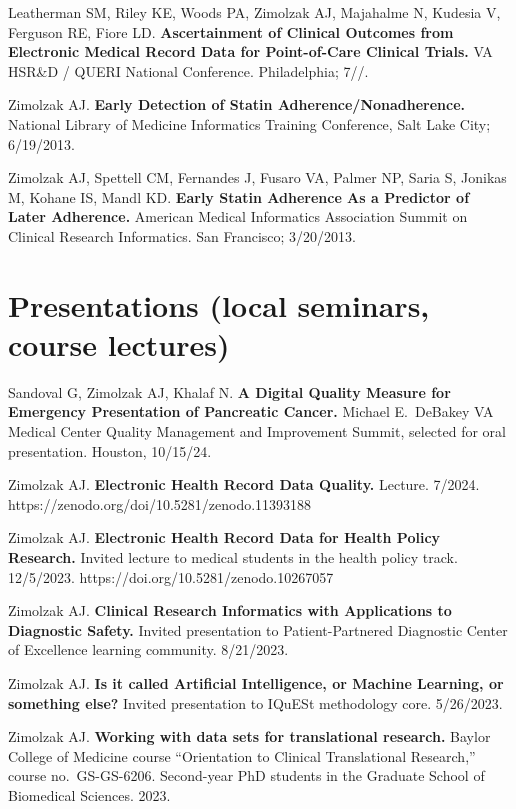 \documentclass[10pt]{article}
\begin{document}
Leatherman SM, Riley KE, Woods PA, Zimolzak AJ, Majahalme N, Kudesia
V, Ferguson RE, Fiore LD. \textbf{Ascertainment of Clinical Outcomes
  from Electronic Medical Record Data for Point-of-Care Clinical
  Trials.} VA HSR\&D / QUERI National Conference. Philadelphia;
7/\ndash{}/.

Zimolzak AJ. \textbf{Early Detection of Statin
  Adherence/Nonadherence.} National Library of Medicine Informatics
Training Conference, Salt Lake City; 6/19/2013.

Zimolzak AJ, Spettell CM, Fernandes J, Fusaro VA, Palmer NP, Saria S,
Jonikas M, Kohane IS, Mandl KD. \textbf{Early Statin Adherence As a
  Predictor of Later Adherence.} American Medical Informatics
Association Summit on Clinical Research Informatics. San Francisco;
3/20/2013.




\section*{Presentations (local seminars, course lectures)}

Sandoval G, Zimolzak AJ, Khalaf N. \textbf{A Digital Quality Measure
  for Emergency Presentation of Pancreatic Cancer.} Michael
E.\ DeBakey VA Medical Center Quality Management and Improvement
Summit, selected for oral presentation. Houston, 10/15/24.


Zimolzak AJ. \textbf{Electronic Health Record Data Quality.} Lecture.
7/2024. https://zenodo.org/doi/10.5281/zenodo.11393188

Zimolzak AJ. \textbf{Electronic Health Record Data for Health Policy
  Research.} Invited lecture to medical students in the health policy
track. 12/5/2023. https://doi.org/10.5281/zenodo.10267057

Zimolzak AJ. \textbf{Clinical Research Informatics with Applications
  to Diagnostic Safety.} Invited presentation to Patient-Partnered
Diagnostic Center of Excellence learning community. 8/21/2023.

Zimolzak AJ. \textbf{Is it called Artificial Intelligence, or Machine
  Learning, or something else?} Invited presentation to IQuESt
methodology core. 5/26/2023.

Zimolzak AJ. \textbf{Working with data sets for translational
  research.} Baylor College of Medicine course ``Orientation to
Clinical Translational Research,'' course no.\ GS-GS-6206. Second-year
PhD students in the Graduate School of Biomedical Sciences. 2023.
\end{document}
